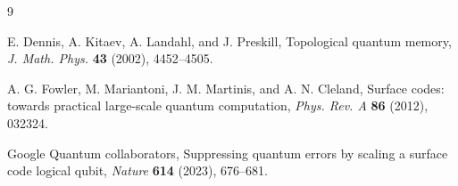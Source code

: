 \documentclass[10pt,letterpaper,twoside]{article}
\begin{document}
\begin{thebibliography}{9}

E. Dennis, A. Kitaev, A. Landahl, and J. Preskill,
Topological quantum memory,
\emph{J. Math. Phys.} \textbf{43} (2002), 4452--4505.

A. G. Fowler, M. Mariantoni, J. M. Martinis, and A. N. Cleland,
Surface codes: towards practical large-scale quantum computation,
\emph{Phys. Rev. A} \textbf{86} (2012), 032324.

Google Quantum collaborators,
Suppressing quantum errors by scaling a surface code logical qubit,
\emph{Nature} \textbf{614} (2023), 676--681.

\end{thebibliography}
\end{document}
